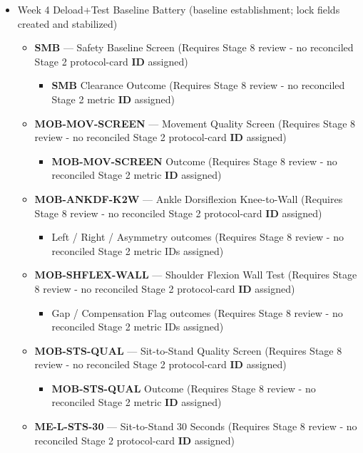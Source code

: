 \documentclass[10pt]{article}
\begin{document}
\begin{itemize}
\item Week 4 Deload+Test Baseline Battery (baseline establishment; lock fields created and stabilized)
  \begin{itemize}
  \item \textbf{SMB} — Safety Baseline Screen (Requires Stage 8 review - no reconciled Stage 2 protocol-card \textbf{ID} assigned)
    \begin{itemize}
    \item \textbf{SMB} Clearance Outcome (Requires Stage 8 review - no reconciled Stage 2 metric \textbf{ID} assigned)
    \end{itemize}
  \item \textbf{MOB-MOV-SCREEN} — Movement Quality Screen (Requires Stage 8 review - no reconciled Stage 2 protocol-card \textbf{ID} assigned)
    \begin{itemize}
    \item \textbf{MOB-MOV-SCREEN} Outcome (Requires Stage 8 review - no reconciled Stage 2 metric \textbf{ID} assigned)
    \end{itemize}
  \item \textbf{MOB-ANKDF-K2W} — Ankle Dorsiflexion Knee-to-Wall (Requires Stage 8 review - no reconciled Stage 2 protocol-card \textbf{ID} assigned)
    \begin{itemize}
    \item Left / Right / Asymmetry outcomes (Requires Stage 8 review - no reconciled Stage 2 metric IDs assigned)
    \end{itemize}
  \item \textbf{MOB-SHFLEX-WALL} — Shoulder Flexion Wall Test (Requires Stage 8 review - no reconciled Stage 2 protocol-card \textbf{ID} assigned)
    \begin{itemize}
    \item Gap / Compensation Flag outcomes (Requires Stage 8 review - no reconciled Stage 2 metric IDs assigned)
    \end{itemize}
  \item \textbf{MOB-STS-QUAL} — Sit-to-Stand Quality Screen (Requires Stage 8 review - no reconciled Stage 2 protocol-card \textbf{ID} assigned)
    \begin{itemize}
    \item \textbf{MOB-STS-QUAL} Outcome (Requires Stage 8 review - no reconciled Stage 2 metric \textbf{ID} assigned)
    \end{itemize}
  \item \textbf{ME-L-STS-30} — Sit-to-Stand 30 Seconds (Requires Stage 8 review - no reconciled Stage 2 protocol-card \textbf{ID} assigned)

\end{itemize}
\end{itemize}
\end{document}
